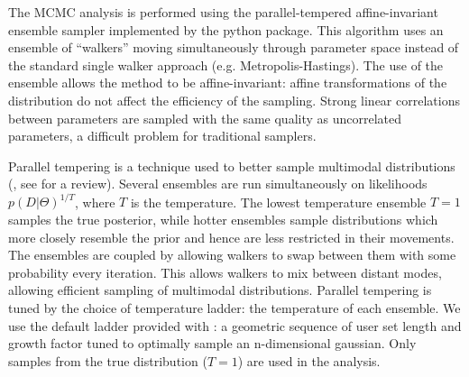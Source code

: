 
The MCMC analysis is performed using the parallel-tempered affine-invariant ensemble sampler implemented by the \emcee{} python package.  This algorithm uses an ensemble of ``walkers'' moving simultaneously through parameter space instead of the standard single walker approach (e.g. Metropolis-Hastings).  The use of the ensemble allows the method to be affine-invariant: affine transformations of the distribution do not affect the efficiency of the sampling.  Strong linear correlations between parameters are sampled with the same quality as uncorrelated parameters, a difficult problem for traditional samplers.  

Parallel tempering is a technique used to better sample multimodal distributions (\citet{Swendsen86, Geyer91}, see \citet{Earl05} for a review).  Several ensembles are run simultaneously on likelihoods $p(D|\Theta)^{1/T}$, where $T$ is the temperature.  The lowest temperature ensemble $T=1$ samples the true posterior, while hotter ensembles sample distributions which more closely resemble the prior and hence are less restricted in their movements.  The ensembles are coupled by allowing walkers to swap between them with some probability every iteration.  This allows walkers to mix between distant modes, allowing efficient sampling of multimodal distributions.  Parallel tempering is tuned by the choice of temperature ladder: the temperature of each ensemble.  We use the default ladder provided with \emcee{}: a geometric sequence of user set length and growth factor tuned to optimally sample an n-dimensional gaussian.  Only samples from the true distribution ($T=1$) are used in the analysis.

